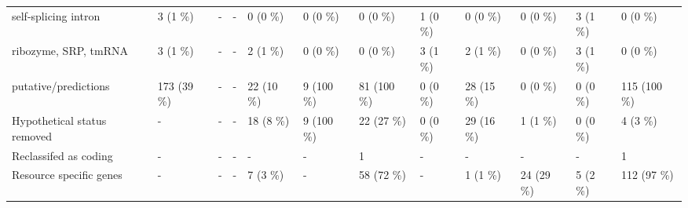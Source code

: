{\begin{tabular}{llllllllllll}
\hspace{1em}self-splicing intron & 3 (1 \%) & - & - & 0 (0 \%) & 0 (0 \%) & 0 (0 \%) & 1 (0 \%) & 0 (0 \%) & 0 (0 \%) & 3 (1 \%) & 0 (0 \%)\\
\hspace{1em}ribozyme, SRP, tmRNA & 3 (1 \%) & - & - & 2 (1 \%) & 0 (0 \%) & 0 (0 \%) & 3 (1 \%) & 2 (1 \%) & 0 (0 \%) & 3 (1 \%) & 0 (0 \%)\\
\hspace{1em}putative/predictions & 173 (39 \%) & - & - & 22 (10 \%) & 9 (100 \%) & 81 (100 \%) & 0 (0 \%) & 28 (15 \%) & 0 (0 \%) & 0 (0 \%) & 115 (100 \%)\\
Hypothetical status removed & - & - & - & 18 (8 \%) & 9 (100 \%) & 22 (27 \%) & 0 (0 \%) & 29 (16 \%) & 1 (1 \%) & 0 (0 \%) & 4 (3 \%)\\
Reclassifed as coding & - & - & - & - & - & 1 & - & - & - & - & 1\\
Resource specific genes & - & - & - & 7 (3 \%) & - & 58 (72 \%) & - & 1 (1 \%) & 24 (29 \%) & 5 (2 \%) & 112 (97 \%)\\
\bottomrule
\end{tabular}}
